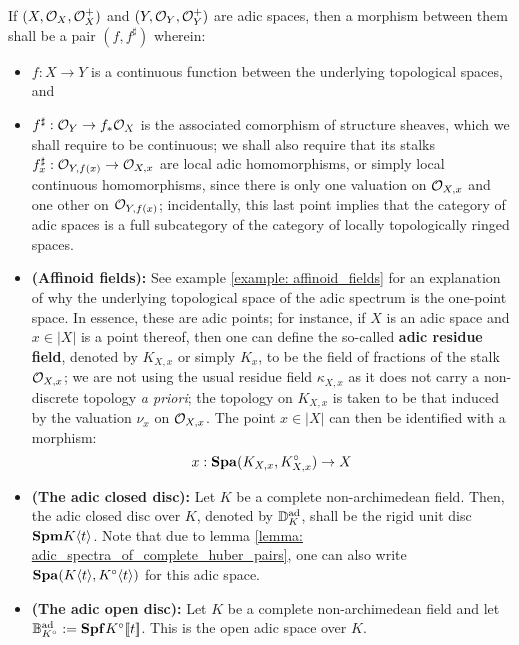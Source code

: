                     \begin{definition}
                        If $(X, \mathcal{O}_X, \mathcal{O}_X^+)$ and $(Y, \mathcal{O}_Y, \mathcal{O}_Y^+)$ are adic spaces, then a morphism between them shall be a pair $(f, f^{\sharp})$ wherein:
                            \begin{itemize}
                                \item $f: X \to Y$ is a continuous function between the underlying topological spaces, and
                                \item $f^{\sharp}: \mathcal{O}_Y \to f_*\mathcal{O}_X$ is the associated comorphism of structure sheaves, which we shall require to be continuous; we shall also require that its stalks $f^{\sharp}_x: \mathcal{O}_{Y, f(x)} \to \mathcal{O}_{X, x}$ are local adic homomorphisms, or simply local continuous homomorphisms, since there is only one valuation on $\mathcal{O}_{X, x}$ and one other on $\mathcal{O}_{Y, f(x)}$; incidentally, this last point implies that the category of adic spaces is a full subcategory of the category of locally topologically ringed spaces.
                            \end{itemize}
                    \end{definition}
                    \begin{example} \label{example: adic_spaces}
                        \noindent
                        \begin{itemize}
                            \item \textbf{(Affinoid fields):} See example \ref{example: affinoid_fields} for an explanation of why the underlying topological space of the adic spectrum is the one-point space. In essence, these are adic points; for instance, if $X$ is an adic space and $x \in |X|$ is a point thereof, then one can define the so-called \textbf{adic residue field}, denoted by $K_{X, x}$ or simply $K_x$, to be the field of fractions of the stalk $\mathcal{O}_{X, x}$; we are not using the usual residue field $\kappa_{X, x}$ as it does not carry a non-discrete topology \textit{a priori}; the topology on $K_{X, x}$ is taken to be that induced by the valuation $\nu_x$ on $\mathcal{O}_{X, x}$. The point $x \in |X|$ can then be identified with a morphism:
                                $$x: \mathbf{Spa}(K_{X, x}, K_{X, x}^{\circ}) \to X$$
                            \item \textbf{(The adic closed disc):} Let $K$ be a complete non-archimedean field. Then, the adic closed disc over $K$, denoted by $\mathbb{D}_K^{\mathrm{ad}}$, shall be the rigid unit disc $\mathbf{Spm} K\langle t\rangle$. Note that due to lemma \ref{lemma: adic_spectra_of_complete_huber_pairs}, one can also write $\mathbf{Spa}(K\langle t\rangle, K^{\circ}\langle t\rangle)$ for this adic space.
                            \item \textbf{(The adic open disc):} Let $K$ be a complete non-archimedean field and let $\mathbb{B}^{\mathrm{ad}}_{K^{\circ}} := \mathbf{Spf} K^{\circ}[\![t]\!]$. This is the open adic space over $K$.
                        \end{itemize}
                    \end{example}
                    
